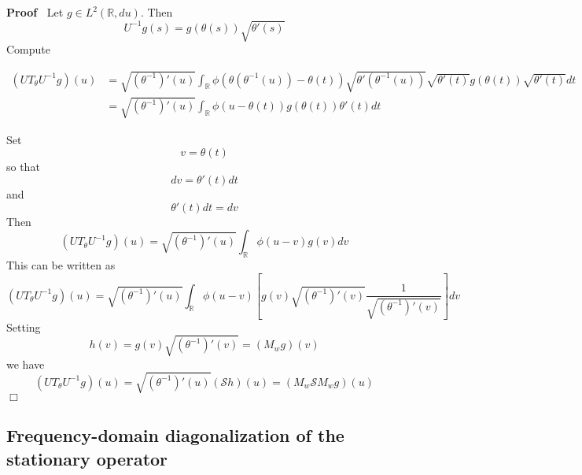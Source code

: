 \documentclass{article}
\newenvironment{proof}{\noindent\textbf{Proof\ }}{\hspace*{\fill}$\Box$\medskip}
{\theorembodyfont{\rmfamily}\newtheorem{example}{Example}}
\begin{document}
\begin{proof}
  Let $g \in L^2 (\mathbb{R}, du)$. Then
  \begin{equation}
    U^{- 1} g (s) = g (\theta (s)) \sqrt{\theta' (s)}
  \end{equation}
  Compute
  
  \begin{align}
    (UT_{\theta} U^{- 1} g) (u) & = \sqrt{(\theta^{- 1})' (u)} 
    \int_{\mathbb{R}} \phi (\theta (\theta^{- 1} (u)) - \theta (t)) 
    \sqrt{\theta' (\theta^{- 1} (u))}  \sqrt{\theta' (t)} g (\theta (t))
    \sqrt{\theta' (t)} dt \\
    & = \sqrt{(\theta^{- 1})' (u)}  \int_{\mathbb{R}} \phi (u - \theta (t)) g
    (\theta (t)) \theta' (t) dt 
  \end{align}
  
  Set
  \begin{equation}
    v = \theta (t)
  \end{equation}
  so that
  \begin{equation}
    dv = \theta' (t) dt
  \end{equation}
  and
  \begin{equation}
    \theta' (t) dt = dv
  \end{equation}
  Then
  \begin{equation}
    (UT_{\theta} U^{- 1} g) (u) = \sqrt{(\theta^{- 1})' (u)} 
    \int_{\mathbb{R}} \phi (u - v) g (v) dv
  \end{equation}
  This can be written as
  \begin{equation}
    (UT_{\theta} U^{- 1} g) (u) = \sqrt{(\theta^{- 1})' (u)} 
    \int_{\mathbb{R}} \phi (u - v)  [g (v) \sqrt{(\theta^{- 1})' (v)} 
    \frac{1}{\sqrt{(\theta^{- 1})' (v)}}] dv
  \end{equation}
  Setting
  \begin{equation}
    h (v) = g (v) \sqrt{(\theta^{- 1})' (v)} = (M_w g) (v)
  \end{equation}
  we have
  \begin{equation}
    (UT_{\theta} U^{- 1} g) (u) = \sqrt{(\theta^{- 1})' (u)}  (\mathcal{S}h)
    (u) = (M_w \mathcal{S}M_w g) (u)
  \end{equation}
\end{proof}

\subsection{Frequency-domain diagonalization of the stationary operator}
\end{document}
